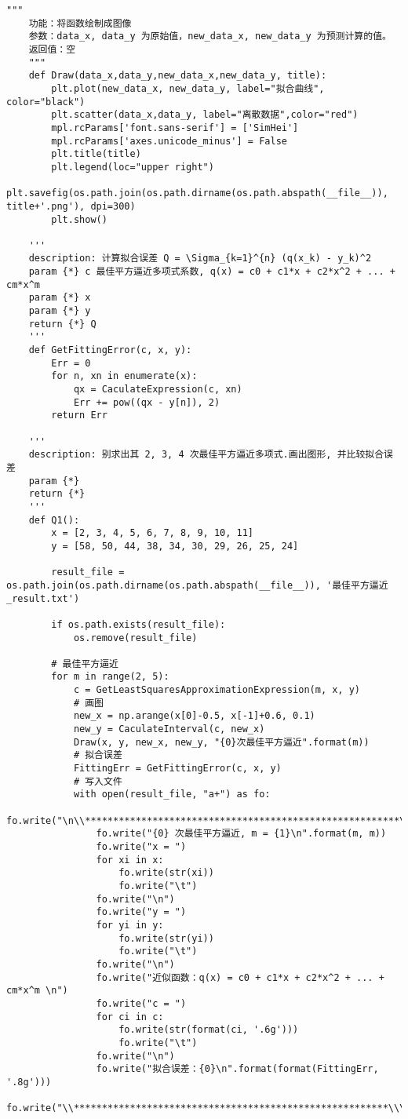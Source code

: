 \begin{lstlisting}[style = python]
    """
    功能：将函数绘制成图像
    参数：data_x, data_y 为原始值，new_data_x, new_data_y 为预测计算的值。
    返回值：空
    """
    def Draw(data_x,data_y,new_data_x,new_data_y, title):
        plt.plot(new_data_x, new_data_y, label="拟合曲线", color="black")
        plt.scatter(data_x,data_y, label="离散数据",color="red")
        mpl.rcParams['font.sans-serif'] = ['SimHei']
        mpl.rcParams['axes.unicode_minus'] = False
        plt.title(title)
        plt.legend(loc="upper right")
        plt.savefig(os.path.join(os.path.dirname(os.path.abspath(__file__)), title+'.png'), dpi=300)
        plt.show()

    '''
    description: 计算拟合误差 Q = \Sigma_{k=1}^{n} (q(x_k) - y_k)^2 
    param {*} c 最佳平方逼近多项式系数, q(x) = c0 + c1*x + c2*x^2 + ... + cm*x^m
    param {*} x
    param {*} y
    return {*} Q
    '''
    def GetFittingError(c, x, y):
        Err = 0
        for n, xn in enumerate(x):
            qx = CaculateExpression(c, xn)
            Err += pow((qx - y[n]), 2)
        return Err

    '''
    description: 别求出其 2, 3, 4 次最佳平方逼近多项式.画出图形, 并比较拟合误差
    param {*}
    return {*}
    '''
    def Q1():
        x = [2, 3, 4, 5, 6, 7, 8, 9, 10, 11]
        y = [58, 50, 44, 38, 34, 30, 29, 26, 25, 24]

        result_file = os.path.join(os.path.dirname(os.path.abspath(__file__)), '最佳平方逼近_result.txt')

        if os.path.exists(result_file):
            os.remove(result_file)
        
        # 最佳平方逼近
        for m in range(2, 5):
            c = GetLeastSquaresApproximationExpression(m, x, y)
            # 画图
            new_x = np.arange(x[0]-0.5, x[-1]+0.6, 0.1)
            new_y = CaculateInterval(c, new_x)
            Draw(x, y, new_x, new_y, "{0}次最佳平方逼近".format(m))
            # 拟合误差
            FittingErr = GetFittingError(c, x, y)
            # 写入文件
            with open(result_file, "a+") as fo:
                fo.write("\n\\********************************************************\\\n")
                fo.write("{0} 次最佳平方逼近, m = {1}\n".format(m, m))
                fo.write("x = ")
                for xi in x:
                    fo.write(str(xi))
                    fo.write("\t")
                fo.write("\n")
                fo.write("y = ")
                for yi in y:
                    fo.write(str(yi))
                    fo.write("\t")
                fo.write("\n")
                fo.write("近似函数：q(x) = c0 + c1*x + c2*x^2 + ... + cm*x^m \n")
                fo.write("c = ")
                for ci in c:
                    fo.write(str(format(ci, '.6g')))
                    fo.write("\t")
                fo.write("\n")
                fo.write("拟合误差：{0}\n".format(format(FittingErr, '.8g')))
                fo.write("\\********************************************************\\\n")


\end{lstlisting}
